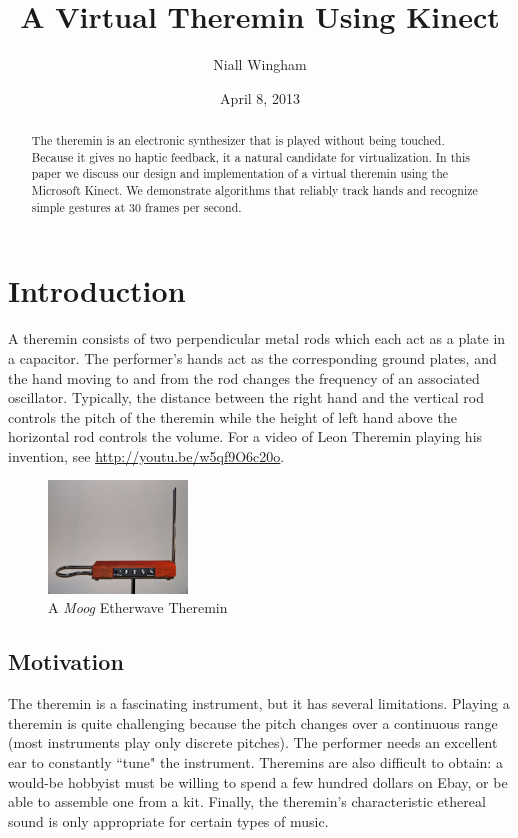 \documentclass[12pt]{article}
\title{A Virtual Theremin Using Kinect}
\author{Niall Wingham}
\date{April 8, 2013}
\begin{document}
\maketitle

\begin{abstract}
The theremin is an electronic synthesizer that is played without being touched.  Because it gives no haptic feedback, it a natural candidate for virtualization.  In this paper we discuss our design and implementation of a virtual theremin using the Microsoft Kinect.  We demonstrate algorithms that reliably track hands and recognize simple gestures at 30 frames per second.
\end{abstract}



\section{Introduction}
A theremin consists of two perpendicular metal rods which each act as a plate in a capacitor.  The performer's hands act as the corresponding ground plates, and the hand moving to and from the rod changes the frequency of an associated oscillator.  Typically, the distance between the right hand and the vertical rod controls the pitch of the theremin while the height of left hand above the horizontal rod controls the volume.  For a video of Leon Theremin playing his invention, see \href{http://youtu.be/w5qf9O6c20o}{http://youtu.be/w5qf9O6c20o}.

\begin{figure}[H]
\caption{A \emph{Moog} Etherwave Theremin}
\centering
\includegraphics[width=0.33\textwidth, natwidth=1684, natheight=1365]{Etherwave_Theremin_Kit.jpg}
\end{figure}

\subsection{Motivation}
The theremin is a fascinating instrument, but it has several limitations.  Playing a theremin is quite challenging because the pitch changes over a continuous range (most instruments play only discrete pitches).  The performer needs an excellent ear to constantly ``tune" the instrument.  Theremins are also difficult to obtain: a would-be hobbyist must be willing to spend a few hundred dollars on Ebay, or be able to assemble one from a kit.  Finally, the theremin's characteristic ethereal sound is only appropriate for certain types of music.
\end{document}
